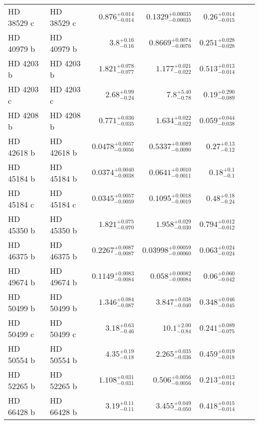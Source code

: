 \begin{longtable*}{llrrrrr}
HD 38529 c & HD 38529 c & $0.876^{+0.014}_{-0.014}$ & $0.1329^{+0.00035}_{-0.00035}$ & $0.26^{+0.014}_{-0.015}$ & \cite{Butler06} & \\
HD 40979 b & HD 40979 b & $3.8^{+0.16}_{-0.16}$ & $0.8669^{+0.0074}_{-0.0076}$ & $0.251^{+0.028}_{-0.028}$ & \cite{Butler06} & \\
HD 4203 b & HD 4203 b & $1.821^{+0.078}_{-0.077}$ & $1.177^{+0.021}_{-0.022}$ & $0.513^{+0.013}_{-0.014}$ & \cite{Vogt02} & \\
HD 4203 c & HD 4203 c & $2.68^{+0.99}_{-0.24}$ & $7.8^{+5.40}_{-0.78}$ & $0.19^{+0.290}_{-0.089}$ & \cite{Kane14} & \\
HD 4208 b & HD 4208 b & $0.771^{+0.036}_{-0.035}$ & $1.634^{+0.022}_{-0.022}$ & $0.059^{+0.044}_{-0.038}$ & \cite{Vogt02} & \\
HD 42618 b & HD 42618 b & $0.0478^{+0.0057}_{-0.0056}$ & $0.5337^{+0.0089}_{-0.0090}$ & $0.27^{+0.13}_{-0.12}$ & \cite{Fulton16} & \\ 
HD 45184 b & HD 45184 b & $0.0374^{+0.0040}_{-0.0038}$ & $0.0641^{+0.0010}_{-0.0011}$ & $0.18^{+0.1}_{-0.1}$ & \cite{Udry19} & \\
HD 45184 c & HD 45184 c & $0.0345^{+0.0057}_{-0.0059}$ & $0.1095^{+0.0018}_{-0.0019}$ & $0.48^{+0.18}_{-0.24}$ & \cite{Udry19} & \\
HD 45350 b & HD 45350 b & $1.821^{+0.075}_{-0.070}$ & $1.958^{+0.029}_{-0.030}$ & $0.794^{+0.012}_{-0.012}$ & \cite{Marcy05} & \\
HD 46375 b & HD 46375 b & $0.2267^{+0.0087}_{-0.0087}$ & $0.03998^{+0.00059}_{-0.00060}$ & $0.063^{+0.024}_{-0.024}$ & \cite{Marcy00} & \\
HD 49674 b & HD 49674 b & $0.1149^{+0.0083}_{-0.0084}$ & $0.058^{+0.00082}_{-0.00084}$ & $0.06^{+0.060}_{-0.042}$ & \cite{Butler03} & \\
HD 50499 b & HD 50499 b & $1.346^{+0.084}_{-0.087}$ & $3.847^{+0.038}_{-0.040}$ & $0.348^{+0.046}_{-0.045}$ & \cite{Vogt05} & \\
HD 50499 c & HD 50499 c & $3.18^{+0.63}_{-0.46}$ & $10.1^{+2.00}_{-0.84}$ & $0.241^{+0.089}_{-0.075}$ & \cite{Rickman19} & \\
HD 50554 b & HD 50554 b & $4.35^{+0.19}_{-0.18}$ & $2.265^{+0.035}_{-0.036}$ & $0.459^{+0.019}_{-0.018}$ & \cite{Fischer02} & \\
HD 52265 b & HD 52265 b & $1.108^{+0.031}_{-0.031}$ & $0.506^{+0.0056}_{-0.0056}$ & $0.213^{+0.013}_{-0.014}$ & \cite{Butler00} & \\
HD 66428 b & HD 66428 b & $3.19^{+0.11}_{-0.11}$ & $3.455^{+0.049}_{-0.050}$ & $0.418^{+0.015}_{-0.014}$ & \cite{Butler06} & \\

\end{longtable*}
